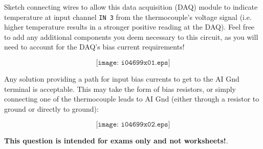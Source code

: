 

Sketch connecting wires to allow this data acquisition (DAQ) module to indicate temperature at input channel {\tt IN 3} from the thermocouple's voltage signal (i.e. higher temperature results in a stronger positive reading at the DAQ).  Feel free to add any additional components you deem necessary to this circuit, as you will need to account for the DAQ's bias current requirements!

\vskip 50pt

$$\texttt{[image: i04699x01.eps]}$$







Any solution providing a path for input bias currents to get to the AI Gnd terminal is acceptable.  This may take the form of bias resistors, or simply connecting one of the thermocouple leads to AI Gnd (either through a resistor to ground or directly to ground):

$$\texttt{[image: i04699x02.eps]}$$







{\bf This question is intended for exams only and not worksheets!}.


